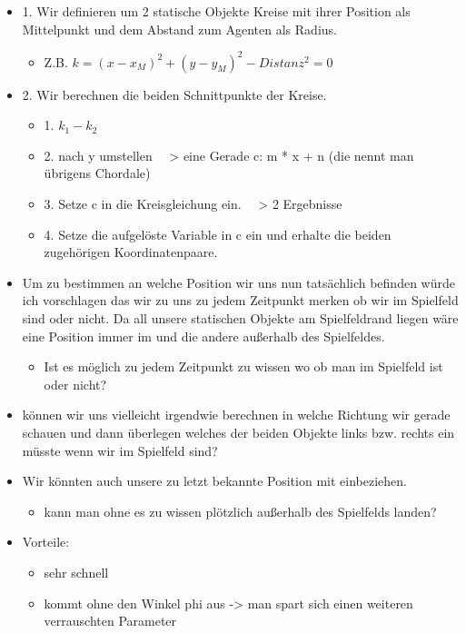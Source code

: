 \begin{itemize}
\item  1. Wir definieren um 2 statische Objekte Kreise mit ihrer Position als Mittelpunkt und dem Abstand zum Agenten als Radius. 
\begin{itemize}
	\item  Z.B. $k = (x-x_M)^2 + (y-y_M)^2 - Distanz^2 = 0$
\end{itemize}
\item  2. Wir berechnen die beiden Schnittpunkte der Kreise.
\begin{itemize}
	\item  1.  $k_1 - k_2$
	\item  2. nach y umstellen ~~> eine Gerade c: m * x + n (die nennt man übrigens Chordale)
	\item  3. Setze c in die Kreisgleichung ein. ~~> 2 Ergebnisse
	\item  4. Setze die aufgelöste Variable in c ein und erhalte die beiden zugehörigen Koordinatenpaare.
\end{itemize}
\item  Um zu bestimmen an welche Position wir uns nun tatsächlich 
befinden würde ich vorschlagen das wir zu uns zu jedem Zeitpunkt merken 
ob wir im Spielfeld sind oder nicht. Da all unsere statischen Objekte am
 Spielfeldrand liegen wäre eine Position immer im und die andere 
außerhalb des Spielfeldes.
\begin{itemize}
	\item  Ist es möglich zu jedem Zeitpunkt zu wissen wo ob man im Spielfeld ist oder nicht?
\end{itemize}
\item  können wir uns vielleicht irgendwie berechnen in welche 
Richtung wir gerade schauen und dann überlegen welches der beiden 
Objekte links bzw. rechts ein müsste wenn wir im Spielfeld sind?
\item Wir könnten auch unsere zu letzt bekannte Position mit einbeziehen.
\begin{itemize}
	\item kann man ohne es zu wissen plötzlich außerhalb des Spielfelds landen?
\end{itemize}
\end{itemize}
\begin{itemize}
\item  Vorteile:
\begin{itemize}
	\item  sehr schnell
	\item  kommt ohne den Winkel phi aus -> man spart sich einen weiteren verrauschten Parameter
\end{itemize}
\end{itemize}
